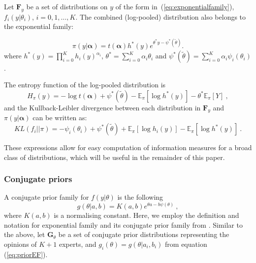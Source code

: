 \documentclass[a4paper, notitlepage, 10pt]{article}
\begin{document}
Let $\mathbf{F}_{y}$ be a set of distributions on $y$ of the form in~(\ref{eq:exponentialfamily}), $f_i(y|\theta_i)$, $ i = 0, 1, \ldots, K$. 
The combined (log-pooled) distribution also belongs to the exponential family:

\begin{equation}
\label{eq:pooldistEF}
\pi(y|\boldsymbol\alpha) = t(\boldsymbol\alpha) h^\ast (y) e^{\theta^\ast y - \psi^\ast (\tilde{\theta})}.
\end{equation}
where $h^\ast (y) = \prod_{i = 0}^K h_i(y)^{\alpha_i}$,  $\theta^\ast = \sum_{i = 0}^K \alpha_i \theta_i$ and $\psi^\ast (\tilde{\theta}) = \sum_{i = 0}^K \alpha_i \psi_i(\theta_i)$.

The entropy function of the log-pooled distribution is
\begin{equation}
\label{eq:entropydistEF}
H_\pi(y) =  -\log t(\boldsymbol\alpha) + \psi^\ast (\tilde{\theta}) - \mathbb{E}_\pi[\log h^\ast (y)] - \theta^\ast\mathbb{E}_\pi[Y] \: ,
\end{equation}
and the Kullback-Leibler divergence between each distribution in $\mathbf{F}_{y}$ and $\pi(y|\boldsymbol\alpha)$ can be written as:
\begin{equation}
\label{eq:KLdistEF}
KL(f_i || \pi)  =  -\psi_i(\theta_i) +   \psi^\ast (\tilde{\theta}) +  \mathbb{E}_\pi[\log h_i(y)] - \mathbb{E}_\pi[\log h^\ast (y)] \: .
\end{equation}

These expressions allow for easy computation of information measures for a broad class of distributions, which will be useful in the remainder of this paper.

\subsubsection*{Conjugate priors}

A conjugate prior family for $f(y|\theta)$ is the following
\begin{equation}
\label{eq:priorEF}
g(\theta | a, b) = K(a,b) e^{\theta a - b \psi(\theta)} \: ,
\end{equation}
where $K(a,b)$ is a normalising constant.
Here, we employ the definition and notation for exponential family and its conjugate prior family from \citet[chapter 3]{robert2001}.
Similar to the above, let $\mathbf{G}_{\theta}$ be a set of conjugate prior distributions representing the opinions of $K+1$ experts, and $g_i(\theta) = g(\theta | a_i, b_i)$ from equation (\ref{eq:priorEF}).
\end{document}
